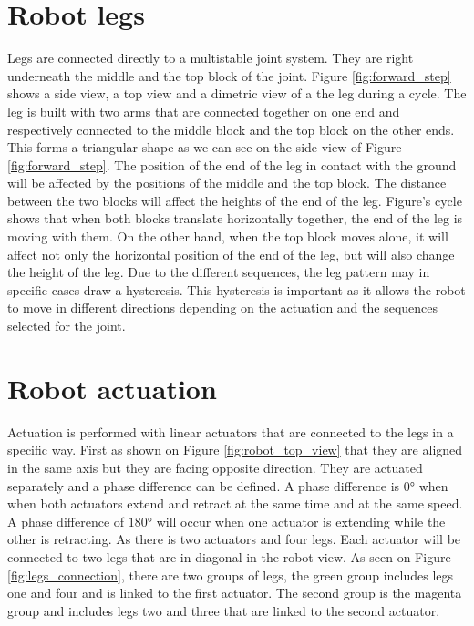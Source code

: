     \section{Robot legs}\label{sec:legs}
        Legs are connected directly to a multistable joint system. They are right underneath the middle and the top block of the joint. Figure \ref{fig:forward_step} shows a side view, a top view and a dimetric view of a the leg during a cycle. 
        The leg is built with two arms that are connected together on one end and respectively connected to the middle block and the top block on the other ends. This forms a triangular shape as we can see on the side view of Figure \ref{fig:forward_step}. The position of the end of the leg in contact with the ground will be affected by the positions of the middle and the top block. The distance between the two blocks will affect the heights of the end of the leg. Figure's cycle shows that when both blocks translate horizontally together, the end of the leg is moving with them. On the other hand, when the top block moves alone, it will affect not only the horizontal position of the end of the leg, but will also change the height of the leg. Due to the different sequences, the leg pattern may in specific cases draw a hysteresis. This hysteresis is important as it allows the robot to move in different directions depending on the actuation and the sequences selected for the joint. 
        
    \section{Robot actuation}\label{sec:actuation}
        Actuation is performed with linear actuators that are connected to the legs in a specific way. First as shown on Figure \ref{fig:robot_top_view} that they are aligned in the same axis but they are facing opposite direction. They are actuated separately and a phase difference can be defined. A phase difference is $0°$ when when both actuators extend and retract at the same time and at the same speed. A phase difference of $180°$ will occur when one actuator is extending while the other is retracting. As there is two actuators and four legs. Each actuator will be connected to two legs that are in diagonal in the robot view. As seen on Figure \ref{fig:legs_connection}, there are two groups of legs, the green group includes legs one and four and is linked to the first actuator. The second group is the magenta group and includes legs two and three that are linked to the second actuator. 
        
